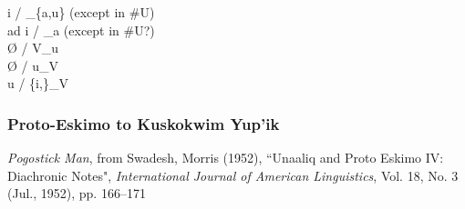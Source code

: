 \documentclass[11pt]{article}
\begin{document}
 \textrightarrow\hspace{0pt} i / _\{a,u\} (except in \#U) \\
ad \textrightarrow\hspace{0pt} i / _a (except in \#U?) \\
 \textrightarrow\hspace{0pt} \O\hspace{0pt} / V_u \\
 \textrightarrow\hspace{0pt} \O\hspace{0pt} / u_V \\
 \textrightarrow\hspace{0pt} u / \{i,\}_V

\subsubsection{Proto-Eskimo to Kuskokwim Yup'ik}{\it Pogostick Man}, from Swadesh, Morris (1952), \textquotedblleft Unaaliq and Proto Eskimo IV: Diachronic Notes", \textit{International Journal of American Linguistics}, Vol. 18, No. 3 (Jul., 1952), pp. 166--171
\end{document}

